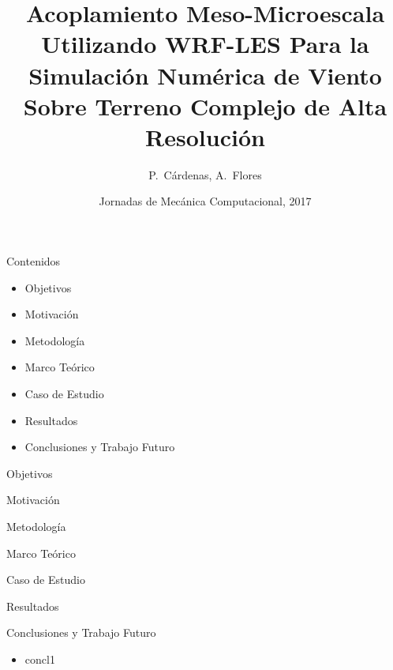 \documentclass[mathserif]{beamer}
\title{Acoplamiento Meso-Microescala Utilizando WRF-LES Para la Simulación Numérica de Viento Sobre Terreno Complejo de Alta Resolución}
\author{P.~Cárdenas, A.~Flores}
\institute[Universidad Técnica Federico Santa María]
{%
  Departamento de Ing. Mecánica\\
  Universidad Técnica Federico Santa María}
\date{Jornadas de Mecánica Computacional, 2017}
\begin{document}
\begin{frame}
  \titlepage
\end{frame}

\begin{frame}{Contenidos}
\begin{itemize}
	\item Objetivos
	\item Motivación
	\item Metodología
	\item Marco Teórico
	\item Caso de Estudio
	\item Resultados
	\item Conclusiones y Trabajo Futuro
\end{itemize}
\end{frame}

\begin{frame}{Objetivos}
\end{frame}

\begin{frame}{Motivación}
\end{frame}
  
\begin{frame}{Metodología}
\end{frame}

\begin{frame}{Marco Teórico}
\end{frame}

\begin{frame}{Caso de Estudio}
\end{frame}

\begin{frame}{Resultados}
\begin{center}
\end{center}
\end{frame}

\begin{frame}{Conclusiones y Trabajo Futuro}
\begin{itemize}
  \item  concl1
\end{itemize}
\end{frame}

\begin{frame}
  \titlepage
\end{frame}
\end{document}
